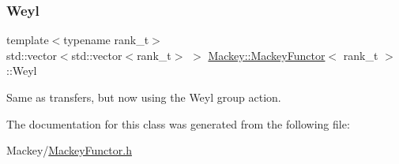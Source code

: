 \subsubsection{\texorpdfstring{Weyl}{Weyl}}
{\footnotesize\ttfamily template$<$typename rank\+\_\+t$>$ \\
std\+::vector$<$std\+::vector$<$rank\+\_\+t$>$ $>$ \hyperlink{classMackey_1_1MackeyFunctor}{Mackey\+::\+Mackey\+Functor}$<$ rank\+\_\+t $>$\+::Weyl}



Same as transfers, but now using the Weyl group action. 



The documentation for this class was generated from the following file\+:\begin{DoxyCompactItemize}
\item 
Mackey/\hyperlink{MackeyFunctor_8h}{Mackey\+Functor.\+h}\end{DoxyCompactItemize}
